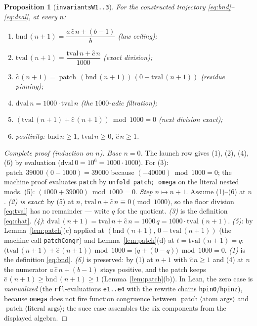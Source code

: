 \documentclass[11pt]{article}
\newcommand{\chat}{\widehat{c}}
\newcommand{\patch}{\operatorname{patch}}
\theoremstyle{plain}
\newtheorem{proposition}[lemma]{Proposition}
\theoremstyle{definition}
\begin{document}
\begin{proposition}[\texttt{invariantsW1..3}]\label{prop:inv}
For the constructed trajectory \eqref{eq:bnd}--\eqref{eq:dval}, at every $n$:
\begin{enumerate}
\item[(1)] $\mathrm{bnd}\,(n+1)=\dfrac{a\,\chat\,n+(b-1)}{b}$ \emph{(law ceiling)};
\item[(2)] $\mathrm{tval}\,(n+1)=\dfrac{\mathrm{tval}\,n+\chat\,n}{1000}$ \emph{(exact division)};
\item[(3)] $\chat\,(n+1)=\patch\,(\mathrm{bnd}\,(n+1))\,(0-\mathrm{tval}\,(n+1))$ \emph{(residue pinning)};
\item[(4)] $\mathrm{dval}\,n=1000\cdot\mathrm{tval}\,n$ \emph{(the $1000$-adic filtration)};
\item[(5)] $(\mathrm{tval}\,(n+1)+\chat\,(n+1))\bmod 1000=0$ \emph{(next division exact)};
\item[(6)] positivity: $\mathrm{bnd}\,n\ge 1$, $\mathrm{tval}\,n\ge 0$, $\chat\,n\ge 1$.
\end{enumerate}
\end{proposition}
\begin{proof}[Complete proof (induction on $n$)]
\emph{Base $n=0$.} The launch row gives (1), (2), (4), (6) by evaluation
($\mathrm{dval}\,0=10^{6}=1000\cdot 1000$). For (3): $\patch\,39000\,(0-1000)=39000$
because $(-40000)\bmod 1000=0$; the machine proof evaluates \texttt{patch} by
\texttt{unfold patch; omega} on the literal nested mods. (5):
$(1000+39000)\bmod 1000=0$.
\emph{Step $n\mapsto n+1$.} Assume (1)--(6) at $n$. \emph{(2) is exact}: by (5) at $n$,
$\mathrm{tval}\,n+\chat\,n\equiv 0\pmod{1000}$, so the floor division \eqref{eq:tval}
has no remainder --- write $q$ for the quotient. \emph{(3)} is the definition
\eqref{eq:chat}. \emph{(4)}: $\mathrm{dval}\,(n+1)=\mathrm{tval}\,n+\chat\,n=1000\,q
=1000\cdot\mathrm{tval}\,(n+1)$. \emph{(5)}: by Lemma~\ref{lem:patch}(c) applied at
$(\mathrm{bnd}\,(n+1),\,0-\mathrm{tval}\,(n+1))$ (the machine call \texttt{patchCongr})
and Lemma~\ref{lem:patch}(d) at $t=\mathrm{tval}\,(n+1)=q$:
$\bigl(\mathrm{tval}\,(n+1)+\chat\,(n+1)\bigr)\bmod 1000
=\bigl(q+(0-q)\bigr)\bmod 1000=0$. \emph{(1)} is the definition \eqref{eq:bnd}.
\emph{(6)} is preserved: by (1) at $n+1$ with $\chat\,n\ge 1$ and (4) at $n$ the numerator
$a\,\chat\,n+(b-1)$ stays positive, and the patch keeps
$\chat\,(n+1)\ge\mathrm{bnd}\,(n+1)\ge 1$ (Lemma~\ref{lem:patch}(b)).
In Lean, the zero case is \emph{manualized} (the \texttt{rfl}-evaluations
\texttt{e1..e4} with the rewrite chains \texttt{hpin0}/\texttt{hpinz}), because
\texttt{omega} does not fire function congruence between
$\patch\langle\text{atom args}\rangle$ and $\patch\langle\text{literal args}\rangle$;
the succ case assembles the six components from the displayed algebra.
\end{proof}
\end{document}
